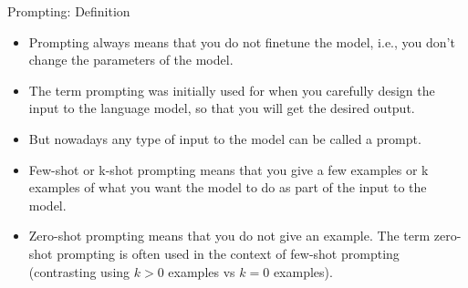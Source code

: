 \documentclass[11pt,compress,t,notes=noshow, xcolor=table]{beamer}
\def\myblue#1{\textcolor{texblue}{#1}}
\begin{document}
\def\myblue#1{\textcolor{texblue}{#1}}

\begin{frame}{Prompting: Definition}

\vfill

\begin{itemize}

\item Prompting always means that you \myblue{do not finetune the model},
i.e., you don't change the parameters of the model.

\item The term prompting was initially used for when you \myblue{carefully design the
input to the language model}, so that you will get the
desired output.

\item \myblue{But nowadays any type of input to the model can be called
a prompt.}

\item \myblue{Few-shot or k-shot prompting} means that you give a few
examples or k examples of what you want the model to do
as part of the input to the model.

\item \myblue{Zero-shot prompting} means that you do not give an example.
The term zero-shot prompting is often used in the context of
few-shot prompting (contrasting using $k>0$ examples vs $k=0$
examples).

\end{itemize}

\vfill

\end{frame}

\endlecture
\end{document}
